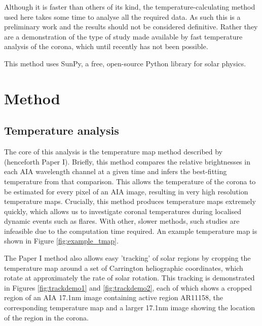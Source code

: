 \documentclass[referee,a4paper,12pt,traditabstract]{swsc}
\begin{document}
\begin{linenumbers}
Although it is faster than others of its kind, the temperature-calculating method used here takes some time to analyse all the required data.
As such this is a preliminary work and the results should not be considered definitive.
Rather they are a demonstration of the type of study made available by fast temperature analysis of the corona, which until recently has not been possible.

This method uses SunPy, a free, open-source Python library for solar physics.

\section{Method}
\subsection{Temperature analysis}
The core of this analysis is the temperature map method described by \cite{Leonard} (henceforth Paper I).
Briefly, this method compares the relative brightnesses in each AIA wavelength channel at a given time and infers the best-fitting temperature from that comparison.
This allows the temperature of the corona to be estimated for every pixel of an AIA image, resulting in very high resolution temperature maps.
Crucially, this method produces temperature maps extremely quickly, which allows us to investigate coronal temperatures during localised dynamic events such as flares.
With other, slower methods, such studies are infeasible due to the computation time required.
An example temperature map is shown in Figure \ref{fig:example_tmap}.

The Paper I method also allows easy 'tracking' of solar regions by cropping the temperature map around a set of Carrington heliographic coordinates, which rotate at approximately the rate of solar rotation.
This tracking is demonstrated in Figures \ref{fig:trackdemo1} and \ref{fig:trackdemo2}, each of which shows a cropped region of an AIA 17.1nm image containing active region AR11158, the corresponding temperature map and a larger 17.1nm image showing the location of the region in the corona.


\end{linenumbers}
\end{document}
